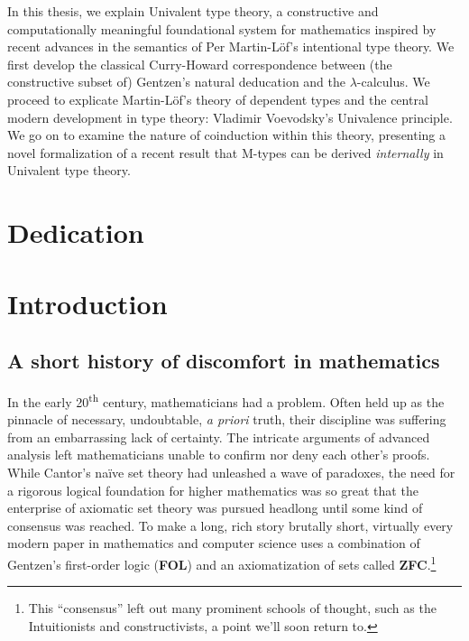 \documentclass[12pt,twoside,draft]{reedthesis}
\makeatletter
\let\oldindex\index
\renewcommand{\index}[1]{\oldindex{#1}\marginpar{\footnotesize\color{index}index: #1}}
\newcommand{\indeX}[1]{\oldindex{#1}}
\newcommand{\abbreviation}[1]{\textbf{#1}\indeX{#1@\textbf{#1}}} %
\makeatother
\begin{document}
In this thesis, we explain Univalent type theory, a constructive and
computationally meaningful foundational system for mathematics inspired by
recent advances in the semantics of Per Martin-L\"of's intentional type theory.
We first develop the classical Curry-Howard correspondence between (the
constructive subset of) Gentzen's natural deducation and the $\lambda$-calculus.
We proceed to explicate Martin-L\"of's theory of dependent types and the central
modern development in type theory: Vladimir Voevodsky's Univalence principle. 
We go on to examine the nature of coinduction within this theory, presenting a
novel formalization of a recent result that M-types can be derived
\textit{internally} in Univalent type theory.

\chapter*{Dedication}

\mainmatter %
\pagestyle{fancyplain} %

\chapter*{Introduction}

\section*{A short history of discomfort in mathematics}


In the early 20\textsuperscript{th} century, mathematicians had a problem. Often
held up as the pinnacle of necessary, undoubtable, \textit{a priori} truth,
their discipline was suffering from an embarrassing lack of certainty. The
intricate arguments of advanced analysis left mathematicians unable to confirm
nor deny each other's proofs. While Cantor's na\"ive set theory had unleashed a
wave of paradoxes, the need for a rigorous logical foundation for higher
mathematics was so great that the enterprise of axiomatic set theory was pursued
headlong until some kind of consensus was reached. To make a long, rich story
brutally short, virtually every modern paper in mathematics and computer
science uses a combination of Gentzen's first-order logic (\abbreviation{FOL})
and an axiomatization of sets called
\abbreviation{ZFC}.\footnote{This ``consensus'' left out many
  prominent schools of thought, such as the Intuitionists and constructivists, a
  point we'll soon return to.} 
\end{document}
